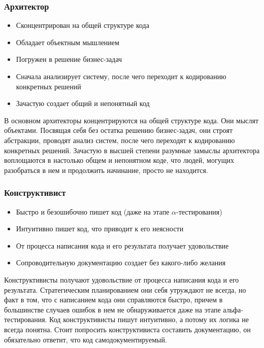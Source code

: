 \documentclass{../industrial-development}
\begin{document}
\begin{frame} \frametitle{Архитектор}
	 \begin{itemize}
                     \item Сконцентрирован на общей структуре кода
 		\item Обладает объектным мышлением
		\item Погружен в решение бизнес-задач
 		\item Сначала анализирует систему, после чего переходит к кодированию конкретных решений
		\item Зачастую создает общий и непонятный код
		\end{itemize} 
\end{frame}
\lecturenotes
В основном архитекторы концентрируются на общей структуре кода. Они мыслят объектами. Посвящая себя без остатка решению бизнес-задач, они строят абстракции, проводят анализ систем, после чего переходят к кодированию конкретных решений.
Зачастую в высшей степени разумные замыслы архитектора воплощаются в настолько общем и непонятном коде, что людей, могущих разобраться в нем и продолжить начинание, просто не находится.

\begin{frame} \frametitle{Конструктивист}
	 \begin{itemize}
                     \item Быстро и безошибочно пишет код (даже на этапе $\alpha$-тестирования)
 		\item Интуитивно пишет код, что приводит к его неясности
		\item От процесса написания кода и его результата получает удовольствие
 		\item Сопроводительную документацию создает без какого-либо желания
		\end{itemize}
\end{frame}
\lecturenotes
Конструктивисты получают удовольствие от процесса написания кода и его результата. Стратегическим планированием они себя утруждают не всегда, но факт в том, что с написанием кода они справляются быстро, причем в большинстве случаев ошибок в нем не обнаруживается даже на этапе альфа-тестирования. Код конструктивисты пишут интуитивно, а потому их логика не всегда понятна.
Стоит попросить конструктивиста составить документацию, он обязательно ответит, что код самодокументируемый.
\end{document}
